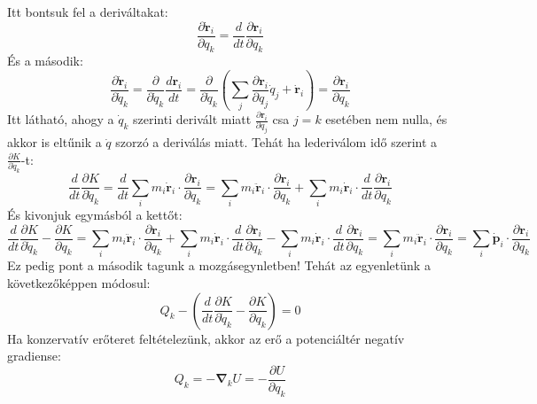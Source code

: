 \documentclass[../main.tex]{subfiles}
\begin{document}
Itt bontsuk fel a deriváltakat:
\begin{equation}
    \frac{\partial \mathbf{\dot{r}}_i}{\partial q_k} = \frac{d}{dt} \frac{\partial \mathbf{r}_i}{\partial q_k}
\end{equation}
És a második:
\begin{equation}
    \frac{\partial \mathbf{\dot{r}}_i}{\partial \dot{q}_k} = \frac{\partial}{\partial \dot{q}_k} \frac{d\mathbf{r}_i}{dt} = \frac{\partial}{\partial \dot{q}_k}\left(\sum_j \frac{\partial \mathbf{r}_i}{\partial q_j} \dot{q}_j + \mathbf{\dot{r}}_i \right) = \frac{\partial \mathbf{r}_i}{\partial q_k}
\end{equation}
Itt látható, ahogy a $\dot{q}_k$ szerinti derivált miatt $\frac{\partial \mathbf{r}_i}{\partial q_j}$ csa $j = k$ esetében nem nulla, és akkor is eltűnik a $\dot{q}$ szorzó a deriválás miatt. Tehát ha lederiválom idő szerint a $\frac{\partial K}{\partial \dot{q}_k}$-t:
\begin{equation}
    \frac{d}{dt} \frac{\partial K}{\partial \dot{q}_k} = \frac{d}{dt} \sum_i m_i \mathbf{\dot{r}}_i \cdot \frac{\partial \mathbf{r}_i}{\partial q_k} = \sum_i m_i \mathbf{\ddot{r}}_i \cdot \frac{\partial \mathbf{r}_i}{\partial q_k} + \sum_i m_i \mathbf{\dot{r}}_i \cdot \frac{d}{dt}\frac{\partial \mathbf{r}_i}{\partial q_k}
\end{equation}
És kivonjuk egymásból a kettőt:
\begin{equation}
    \frac{d}{dt} \frac{\partial K}{\partial \dot{q}_k} - \frac{\partial K}{\partial q_k} = \sum_i m_i \mathbf{\ddot{r}}_i \cdot \frac{\partial \mathbf{r}_i}{\partial q_k} + \sum_i m_i \mathbf{\dot{r}}_i \cdot \frac{d}{dt}\frac{\partial \mathbf{r}_i}{\partial q_k} - \sum_i m_i \mathbf{\dot{r}}_i \cdot \frac{d}{dt}\frac{\partial \mathbf{r}_i}{\partial q_k} = \sum_i m_i \mathbf{\ddot{r}}_i \cdot \frac{\partial \mathbf{r}_i}{\partial q_k} = \sum_i \mathbf{\dot{p}}_i \cdot \frac{\partial \mathbf{r}_i}{\partial q_k}
\end{equation}
Ez pedig pont a második tagunk a mozgásegynletben! Tehát az egyenletünk a következőképpen módosul:
\begin{equation}
    Q_k - \left(\frac{d}{dt} \frac{\partial K}{\partial \dot{q}_k} - \frac{\partial K}{\partial q_k}\right) = 0
\end{equation}
Ha konzervatív erőteret feltételezünk, akkor az erő a potenciáltér negatív gradiense:
\begin{equation}
    Q_k = -\boldsymbol{\nabla}_k U = - \frac{\partial U}{\partial q_k}
\end{equation}
\end{document}
